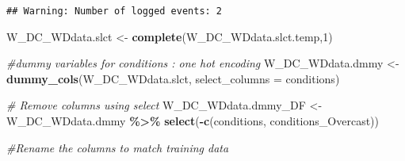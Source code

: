 \documentclass[
]{article}
\newenvironment{Shaded}{\begin{snugshade}}{\end{snugshade}}
\newcommand{\AttributeTok}[1]{\textcolor[rgb]{0.13,0.29,0.53}{#1}}
\newcommand{\CommentTok}[1]{\textcolor[rgb]{0.56,0.35,0.01}{\textit{#1}}}
\newcommand{\DecValTok}[1]{\textcolor[rgb]{0.00,0.00,0.81}{#1}}
\newcommand{\FunctionTok}[1]{\textcolor[rgb]{0.13,0.29,0.53}{\textbf{#1}}}
\newcommand{\NormalTok}[1]{#1}
\newcommand{\OtherTok}[1]{\textcolor[rgb]{0.56,0.35,0.01}{#1}}
\newcommand{\SpecialCharTok}[1]{\textcolor[rgb]{0.81,0.36,0.00}{\textbf{#1}}}
\newcommand{\StringTok}[1]{\textcolor[rgb]{0.31,0.60,0.02}{#1}}
\begin{document}
\begin{verbatim}
## Warning: Number of logged events: 2
\end{verbatim}

\begin{Shaded}
\begin{Highlighting}[]
\NormalTok{W\_DC\_WDdata.slct }\OtherTok{\textless{}{-}} \FunctionTok{complete}\NormalTok{(W\_DC\_WDdata.slct.temp,}\DecValTok{1}\NormalTok{)}

\CommentTok{\#dummy variables for conditions : one hot encoding}
\NormalTok{W\_DC\_WDdata.dmmy }\OtherTok{\textless{}{-}} \FunctionTok{dummy\_cols}\NormalTok{(W\_DC\_WDdata.slct, }
                                         \AttributeTok{select\_columns =} \StringTok{\textquotesingle{}conditions\textquotesingle{}}\NormalTok{)}

\CommentTok{\# Remove columns using select}
\NormalTok{W\_DC\_WDdata.dmmy\_DF }\OtherTok{\textless{}{-}}\NormalTok{ W\_DC\_WDdata.dmmy }\SpecialCharTok{\%\textgreater{}\%} \FunctionTok{select}\NormalTok{(}\SpecialCharTok{{-}}\FunctionTok{c}\NormalTok{(conditions,}
\NormalTok{                                                      conditions\_Overcast))}

\CommentTok{\#Rename the columns to match training data }


\end{Highlighting}
\end{Shaded}
\end{document}
